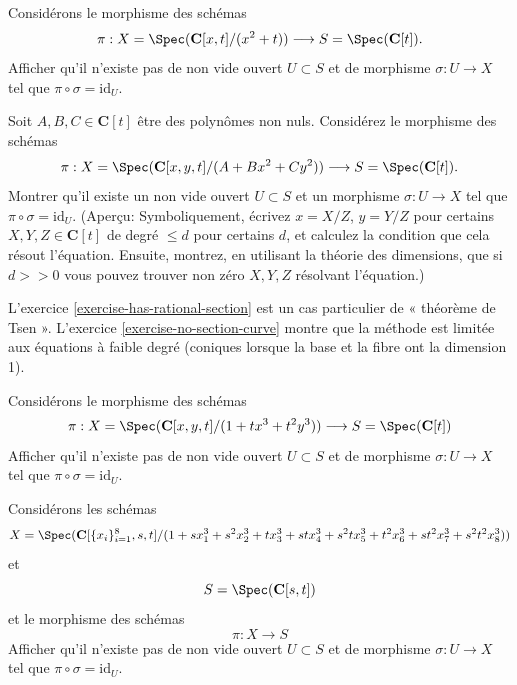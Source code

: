 \begin{exercise}
\label{exercise-no-rational-section}
Considérons le morphisme des schémas
$$
\pi :
X = \Spec(\mathbf{C}[x, t]/(x^2 + t))
\longrightarrow
S = \Spec(\mathbf{C}[t]).
$$
Afficher qu'il n'existe pas de non vide ouvert $U \subset S$ et
de morphisme $\sigma : U \to X$ tel que $\pi \circ \sigma = \text{id}_U$.
\end{exercise}

\begin{exercise}
\label{exercise-has-rational-section}
Soit $A, B, C \in \mathbf{C}[t]$ être des polynômes non
nuls. Considérez le morphisme des schémas
$$
\pi :
X = \Spec(\mathbf{C}[x, y, t]/(A + Bx^2 + Cy^2))
\longrightarrow
S = \Spec(\mathbf{C}[t]).
$$
Montrer qu'il existe un non vide ouvert $U \subset S$ et
un morphisme $\sigma : U \to X$ tel que $\pi \circ \sigma = \text{id}_U$.
(Aperçu: Symboliquement, écrivez $x = X/Z$, $y = Y/Z$ pour certains
$X, Y, Z \in \mathbf{C}[t]$ de degré $\leq d$ pour certains $d$,
et calculez la condition que cela résout l'équation. Ensuite, montrez, en
utilisant la théorie des dimensions, que si $d >> 0$ vous pouvez
trouver non zéro $X, Y, Z$ résolvant l'équation.)
\end{exercise}

\begin{remark}
\label{remark-tsen}
L'exercice \ref{exercise-has-rational-section} est un cas particulier de
« théorème de Tsen ». L'exercice
\ref{exercise-no-section-curve} montre que la méthode est limitée aux équations
à faible degré (coniques lorsque la base et la fibre
ont la dimension 1).
\end{remark}

\begin{exercise}
\label{exercise-no-section-curve}
Considérons le morphisme des schémas
$$
\pi :
X = \Spec(\mathbf{C}[x, y, t]
/(1 + t x^3 + t^2 y^3))
\longrightarrow
S = \Spec(\mathbf{C}[t])
$$
Afficher qu'il n'existe pas de non vide ouvert $U \subset S$ et
de morphisme $\sigma : U \to X$ tel que $\pi \circ \sigma = \text{id}_U$.
\end{exercise}

\begin{exercise}
\label{exercise-no-section-surface}
Considérons les schémas
$$
X = \Spec(\mathbf{C}[\{x_i\}_{i = 1}^{8}, s, t]
/(1 + s x_1^3 + s^2 x_2^3 +
t x_3^3 + st x_4^3 + s^2t x_5^3 +
t^2 x_6^3 + st^2 x_7^3 + s^2t^2 x_8^3))
$$
et
$$
S = \Spec(\mathbf{C}[s, t])
$$
et le morphisme des schémas
$$
\pi : X \longrightarrow S
$$
Afficher qu'il n'existe pas de non vide ouvert $U \subset S$ et
de morphisme $\sigma : U \to X$ tel que $\pi \circ \sigma = \text{id}_U$.
\end{exercise}

